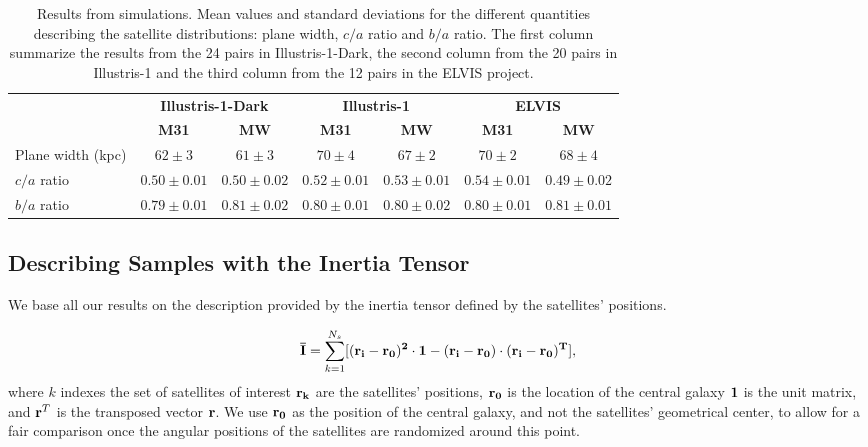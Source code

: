 \documentclass[a4paper,fleqn,usenatbib]{mnras}
\begin{document}
\begin{table}
  \centering
  \renewcommand{\arraystretch}{1.2}
  \begin{tabular}{|p{2.5cm}|c|c|c|c|c|c|}
    \hline
    \multirow{2}{4.0cm}{} & \multicolumn{2}{c|}{\textbf{Illustris-1-Dark}} & \multicolumn{2}{c|}{\textbf{Illustris-1}} & \multicolumn{2}{c|}{\textbf{ELVIS}}\\
    \cline{2-7}
    & \textbf{M31} & \textbf{MW} & \textbf{M31} & \textbf{MW}& \textbf{M31} & \textbf{MW}\\
    \hline
    Plane width (kpc) & $62\pm 3$   & $61\pm 3$     & $70\pm 4$ & $67\pm 2$ & $70\pm 2$& $68\pm 4$ \\\hline
    $c/a$ ratio & $0.50\pm0.01$ & $0.50\pm 0.02$ & $0.52\pm 0.01$ & $0.53\pm 0.01$ & $0.54\pm 0.01$& $0.49\pm 0.02$ \\ \hline
    $b/a$ ratio & $0.79\pm0.01$ & $0.81\pm 0.02$ & $0.80\pm 0.01$ & $0.80\pm 0.02$ & $0.80\pm0.01$& $0.81\pm 0.01$\\ \hline
  \end{tabular}
  \caption{Results from simulations. Mean values and standard deviations for the different
    quantities describing the satellite distributions: plane width, $c/a$
    ratio and $b/a$ ratio. 
    The first column summarize the results from the 24 pairs in
    Illustris-1-Dark, the second column from the 20 pairs in
    Illustris-1 and the third column from the 12 pairs in the
    ELVIS project.\label{table:simulations}}
\end{table}



\subsection{Describing Samples with the Inertia Tensor}
We base all our results on the description provided by the inertia
tensor defined by the satellites' positions.  

\begin{equation}
{\bf{\bar{I}}} = \sum_{k=1}^{N_s}[(\bf{r}_i - \bf{r}_0)^2\cdot \bf{1} -
  (\bf{r}_i-\bf{r}_0)\cdot (\bf{r}_i - \bf{r}_0)^{T}],
\label{eq:intensor}
\end{equation}
%
where $k$ indexes the set of satellites of interest
$\bf{r}_k$ are the satellites' positions, $\bf{r}_{0}$ is the location
of the central galaxy $\bf{1}$ is the unit matrix, and  
${\bf r}^T$ is the transposed vector $\bf{r}$. 
We use $\bf{r}_0$ as the position of the central galaxy, and not the
satellites' geometrical center, to allow for a fair comparison once
the angular positions of the satellites are randomized around this
point. 
\end{document}
